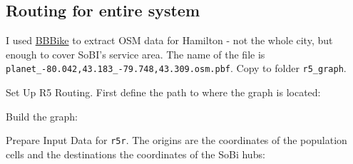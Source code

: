 \documentclass[
]{article}
\newenvironment{Shaded}{\begin{snugshade}}{\end{snugshade}}
\newcommand{\CommentTok}[1]{\textcolor[rgb]{0.56,0.35,0.01}{\textit{#1}}}
\newcommand{\DataTypeTok}[1]{\textcolor[rgb]{0.13,0.29,0.53}{#1}}
\newcommand{\DecValTok}[1]{\textcolor[rgb]{0.00,0.00,0.81}{#1}}
\newcommand{\KeywordTok}[1]{\textcolor[rgb]{0.13,0.29,0.53}{\textbf{#1}}}
\newcommand{\NormalTok}[1]{#1}
\newcommand{\OperatorTok}[1]{\textcolor[rgb]{0.81,0.36,0.00}{\textbf{#1}}}
\newcommand{\StringTok}[1]{\textcolor[rgb]{0.31,0.60,0.02}{#1}}
\begin{document}
\hypertarget{routing-for-entire-system}{%
\subsection{Routing for entire system}\label{routing-for-entire-system}}

I used \href{https://download.bbbike.org/osm/bbbike/}{BBBike} to extract
OSM data for Hamilton - not the whole city, but enough to cover SoBI's
service area. The name of the file is
\texttt{planet\_-80.042,43.183\_-79.748,43.309.osm.pbf}. Copy to folder
\texttt{r5\_graph}.

Set Up R5 Routing. First define the path to where the graph is located:

Build the graph:

Prepare Input Data for \texttt{r5r}. The origins are the coordinates of
the population cells and the destinations the coordinates of the SoBi
hubs:

\begin{Shaded}
\end{Shaded}
\end{document}
